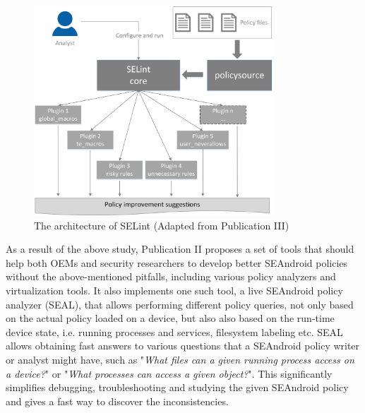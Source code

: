 \begin{figure}[t]
	\centering
		\includegraphics[width=0.80\textwidth]{figures/selint.png}
	\caption{The architecture of SELint (Adapted from Publication III)}
	\label{fig:selint}
\end{figure}

As a result of the above study, Publication II proposes a set of tools that should help both OEMs and security researchers to develop better SEAndroid policies without the above-mentioned pitfalls, including various policy analyzers and virtualization tools. It also implements one such tool, a live SEAndroid policy analyzer (SEAL), that allows performing different policy queries, not only based on the actual policy loaded on a device, but also also based on the run-time device state, i.e. running processes and services, filesystem labeling etc. SEAL allows obtaining fast answers to various questions that a SEAndroid policy writer or analyst might have, such as "\textit{What files can a given running process access on a device?}" or "\textit{What processes can access a given object?}". This significantly simplifies debugging, troubleshooting and studying the given SEAndroid policy and gives a fast way to discover the inconsistencies. 

